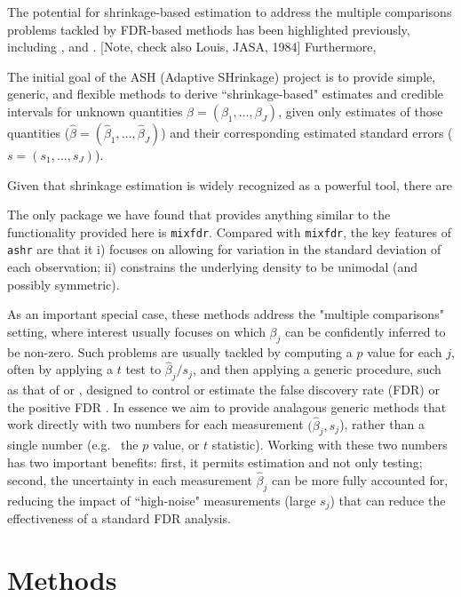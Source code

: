 \documentclass[11pt]{article}
\def\bhat{\hat{\beta}}
\def\mixfdr{{\tt mixfdr}\xspace}
\def\ashr{{\tt ashr}\xspace}
\begin{document}
The potential for shrinkage-based estimation to
address the multiple comparisons problems tackled by FDR-based methods
has been highlighted
previously, including \cite{greenland1991empirical},
\cite{efron2008microarrays} and \cite{gelman2012we}. [Note, check also Louis, JASA, 1984] 
Furthermore, 

The initial goal of the ASH (Adaptive SHrinkage) project is to provide simple, generic, and flexible methods to derive ``shrinkage-based" estimates and credible intervals for unknown quantities $\beta=(\beta_1,\dots,\beta_J)$, given only estimates of those quantities ($\bhat=(\bhat_1,\dots, \bhat_J)$) and their corresponding estimated standard errors ($s=(s_1,\dots,s_J)$). 





Given that shrinkage estimation is widely recognized as a powerful tool, there are 


The only package we have found that provides anything similar
to the functionality provided here is \mixfdr \cite{muralidharan2010empirical}. Compared with \mixfdr, the key features of \ashr are that it
i) focuses on allowing for variation in the standard deviation of each observation; ii) constrains the underlying density to be unimodal (and possibly symmetric).


As an important special case, these methods address the "multiple comparisons" setting, where interest usually focuses on which $\beta_j$ can be confidently inferred to be non-zero. Such problems are usually tackled by computing a $p$ value for each $j$, often by applying a $t$ test to $\bhat_j/s_j$,
and then applying a generic procedure, such as that of \cite{benjamini1995controlling} or \cite{storey2003statistical}, designed to control or
estimate the false discovery rate (FDR) or the positive FDR \cite{storey.03}. In essence we aim to provide analagous
generic methods that work directly with two numbers for each 
measurement $(\bhat_j,s_j$), rather than a single number (e.g.~ the $p$ value, or $t$ statistic). Working with these two numbers has two important benefits: first, it permits estimation and not only testing; second, the 
uncertainty in each measurement $\bhat_j$ can be more fully accounted for, reducing the impact of ``high-noise" measurements (large $s_j$) that can reduce the effectiveness of a standard FDR analysis. 

\def\df{df}
\def\FDR{\text{FDR}}
\def\fdr{\text{lfdr}}

 \section*{Methods}
 
\end{document}
